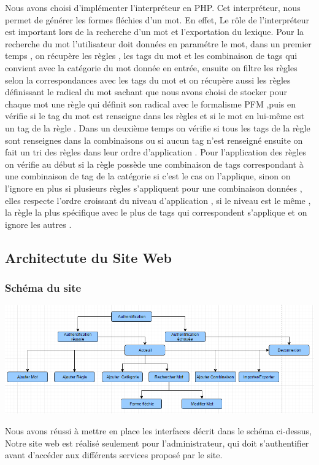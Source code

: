 \documentclass[12pt,a4paper]{article}
\begin{document}
Nous avons choisi d'implémenter l'interpréteur en PHP.
Cet interpréteur, nous permet de générer les formes fléchies d'un mot.
En effet, Le rôle de l'interpréteur est important lors de la recherche d'un mot et l'exportation du lexique.
Pour la recherche du mot l'utilisateur doit données en paramétre le mot, 
dans un premier temps , on récupère les règles , les tags du mot et les combinaison de tags qui convient avec la catégorie du mot donnée en entrée, ensuite on filtre les règles selon la correspondances avec les tags du mot et on récupère aussi les règles définissant le radical du mot sachant que nous avons choisi de stocker pour chaque mot une règle qui définit son radical avec le formalisme PFM ,puis en vérifie si le tag du mot est renseigne dans les règles et si le mot en lui-même est un tag de la règle . 
Dans un deuxième temps on vérifie si tous les tags de la règle sont renseignes dans la combinaisons ou si aucun tag n'est renseigné ensuite on fait un tri des règles dans leur ordre d'application .
Pour l'application des règles on vérifie au début si la règle possède une combinaison de tags correspondant à une combinaison de tag de la catégorie si c'est le cas on l'applique, sinon on l'ignore en plus si plusieurs règles s'appliquent pour une combinaison données , elles respecte l'ordre croissant du niveau d'application , si le niveau est le même , la règle la plus spécifique avec le plus de tags qui correspondent s'applique et on ignore les autres .


\subsection{ Architectute du Site Web }
\subsubsection{Schéma du site} 

\includegraphics[width=150mm]{img/site.PNG}

Nous avons réussi à mettre en place les interfaces décrit dans le schéma ci-dessus,
Notre site web est réalisé seulement pour l'administrateur, qui doit s'authentifier
avant d'accéder aux différents services proposé par le site.
\end{document}
